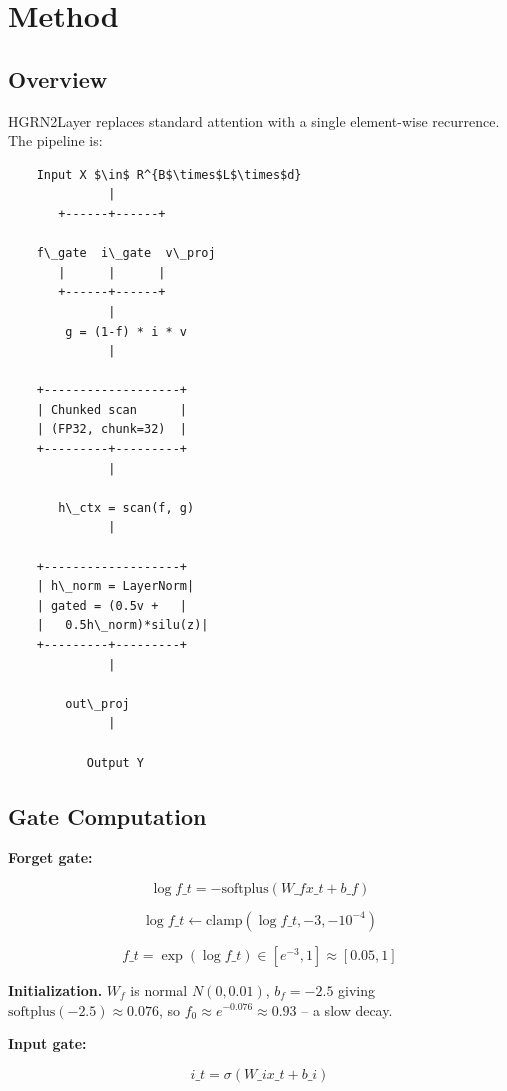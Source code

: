 \section{Method}

\subsection{Overview}

HGRN2Layer replaces standard attention with a single element-wise recurrence. 
The pipeline is:

\begin{lstlisting}
    Input X $\in$ R^{B$\times$L$\times$d}
              |
       +------+------+
                      
    f\_gate  i\_gate  v\_proj
       |      |      |
       +------+------+
              |
        g = (1-f) * i * v
              |
               
    +-------------------+
    | Chunked scan      |
    | (FP32, chunk=32)  |
    +---------+---------+
              |
               
       h\_ctx = scan(f, g)
              |
               
    +-------------------+
    | h\_norm = LayerNorm|
    | gated = (0.5v +   |
    |   0.5h\_norm)*silu(z)|
    +---------+---------+
              |
               
        out\_proj
              |
               
           Output Y
\end{lstlisting}

\subsection{Gate Computation}

\textbf{Forget gate:}

\[
\log f\_t = -\text{softplus}(W\_f x\_t + b\_f)
\tag{4.1}
\]

\[
\log f\_t \leftarrow \text{clamp}(\log f\_t, -3, -10^{-4})
\tag{4.2}
\]

\[
f\_t = \exp(\log f\_t) \in [e^{-3}, 1] \approx [0.05, 1]
\tag{4.3}
\]

\textbf{Initialization.} $W_f$ is normal $N(0, 0.01)$, $b_f = -2.5$ giving 
$\text{softplus}(-2.5) \approx 0.076$, so $f_0 \approx e^{-0.076} \approx 0.93$ 
-- a slow decay.

\textbf{Input gate:}

\[
i\_t = \sigma(W\_i x\_t + b\_i)
\tag{4.4}
\]

